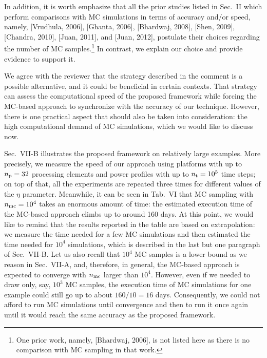 \begin{authors}
In addition, it is worth emphasize that all the prior studies listed in Sec.~II which perform comparisons with MC simulations in terms of accuracy and/or speed, namely, [Vrudhula, 2006], [Ghanta, 2006], [Bhardwaj, 2008], [Shen, 2009], [Chandra, 2010], [Juan, 2011], and [Juan, 2012], postulate their choices regarding the number of MC samples.\footnote{One prior work, namely, [Bhardwaj, 2006], is not listed here as there is no comparison with MC sampling in that work.}
In contrast, we explain our choice and provide evidence to support it.

We agree with the reviewer that the strategy described in the comment is a possible alternative, and it could be beneficial in certain contexts.
That strategy can assess the computational speed of the proposed framework while forcing the MC-based approach to synchronize with the accuracy of our technique.
However, there is one practical aspect that should also be taken into consideration: the high computational demand of MC simulations, which we would like to discuss now.

Sec.~VII-B illustrates the proposed framework on relatively large examples.
More precisely, we measure the speed of our approach using platforms with up to ${n_\text{p}} = 32$ processing elements and power profiles with up to ${n_\text{t}} = 10^5$ time steps; on top of that, all the experiments are repeated three times for different values of the $\eta$ parameter.
Meanwhile, it can be seen in Tab.~VI that MC sampling with ${n_\text{mc}} = 10^4$ takes an enormous amount of time: the estimated execution time of the MC-based approach climbs up to around 160 days.
At this point, we would like to remind that the results reported in the table are based on extrapolation: we measure the time needed for a few MC simulations and then estimated the time needed for $10^4$ simulations, which is described in the last but one paragraph of Sec.~VII-B.
Let us also recall that $10^4$ MC samples is a lower bound as we reason in Sec.~VII-A, and, therefore, in general, the MC-based approach is expected to converge with ${n_\text{mc}}$ larger than $10^4$.
However, even if we needed to draw only, say, $10^3$ MC samples, the execution time of MC simulations for one example could still go up to about $160 / 10 = 16$ days.
Consequently, we could not afford to run MC simulations until convergence and then to run it once again until it would reach the same accuracy as the proposed framework.

\begin{actions}
\end{actions}
\end{authors}

